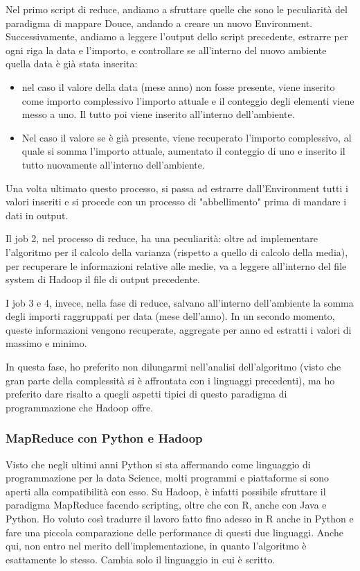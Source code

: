 Nel primo script di reduce, andiamo a sfruttare quelle che sono le peculiarità del paradigma di mappare Douce, andando a creare un nuovo Environment. Successivamente, andiamo a leggere l'output dello script precedente, estrarre per ogni riga la data e l'importo, e controllare se all'interno del nuovo ambiente quella data è già stata inserita:
\begin{itemize}
    \item nel caso il valore della data (mese anno) non fosse presente, viene inserito come importo complessivo l'importo attuale e il conteggio degli elementi viene messo a uno. Il tutto poi viene inserito all'interno dell'ambiente.
    \item Nel caso il valore se è già presente, viene recuperato l'importo complessivo, al quale si somma l'importo attuale, aumentato il conteggio di uno e inserito il tutto nuovamente all'interno dell'ambiente.
\end{itemize}
Una volta ultimato questo processo, si passa ad estrarre dall'Environment tutti i valori inseriti e si procede con un processo di "abbellimento" prima di mandare i dati in output.

Il job 2, nel processo di reduce, ha una peculiarità: oltre ad implementare l'algoritmo per il calcolo della varianza (rispetto a quello di calcolo della media), per recuperare le informazioni relative alle medie, va a leggere all'interno del file system di Hadoop il file di output precedente.

I job 3 e 4, invece, nella fase di reduce, salvano all'interno dell'ambiente la somma degli importi raggruppati per data (mese dell'anno). In un secondo momento, queste informazioni vengono recuperate, aggregate per anno ed estratti i valori di massimo e minimo.

In questa fase, ho preferito non dilungarmi nell'analisi dell'algoritmo (visto che gran parte della complessità si è affrontata con i linguaggi precedenti), ma ho preferito dare risalto a quegli aspetti tipici di questo paradigma di programmazione che Hadoop offre.
\subsubsection{MapReduce con Python e Hadoop}
Visto che negli ultimi anni Python si sta affermando come linguaggio di programmazione per la data Science, molti programmi e piattaforme si sono aperti alla compatibilità con esso. Su Hadoop, è infatti possibile sfruttare il paradigma MapReduce facendo scripting, oltre che con R, anche con Java e Python. Ho voluto così tradurre il lavoro fatto fino adesso in R anche in Python e fare una piccola comparazione delle performance di questi due linguaggi. Anche qui, non entro nel merito dell'implementazione, in quanto l'algoritmo è esattamente lo stesso. Cambia solo il linguaggio in cui è scritto.

